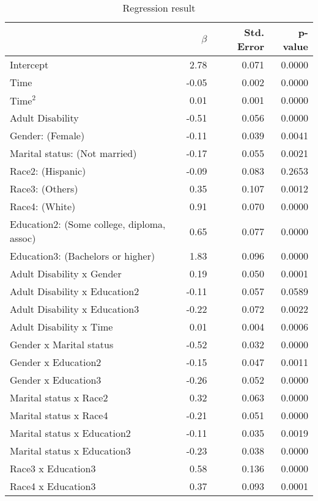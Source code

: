\begin{table}[H]
\footnotesize
\centering
\caption{Regression result} 
\begin{tabular}{lrrr}
  \hline
  & $\beta$ & Std. Error & p-value \\ 
  \hline
  Intercept & 2.78 & 0.071 & 0.0000 \\ 
  Time & -0.05 & 0.002 & 0.0000 \\ 
  $\text{Time}^2$ & 0.01 & 0.001 & 0.0000 \\ 
  Adult Disability & -0.51 & 0.056 & 0.0000 \\ 
  Gender: (Female) & -0.11 & 0.039 & 0.0041 \\ 
  Marital status: (Not married) & -0.17 & 0.055 & 0.0021 \\ 
  Race2: (Hispanic) & -0.09 & 0.083 & 0.2653 \\ 
  Race3: (Others) & 0.35 & 0.107 & 0.0012 \\ 
  Race4: (White) & 0.91 & 0.070 & 0.0000 \\ 
  Education2: (Some college, diploma, assoc) & 0.65 & 0.077 & 0.0000 \\ 
  Education3: (Bachelors or higher) & 1.83 & 0.096 & 0.0000 \\ 
  Adult Disability x Gender & 0.19 & 0.050 & 0.0001 \\ 
  Adult Disability x Education2 & -0.11 & 0.057 & 0.0589 \\ 
  Adult Disability x Education3 & -0.22 & 0.072 & 0.0022 \\ 
  Adult Disability x Time & 0.01 & 0.004 & 0.0006 \\ 
  Gender x Marital status & -0.52 & 0.032 & 0.0000 \\ 
  Gender x Education2 & -0.15 & 0.047 & 0.0011 \\ 
  Gender x Education3 & -0.26 & 0.052 & 0.0000 \\ 
  Marital status x Race2 & 0.32 & 0.063 & 0.0000 \\ 
  Marital status x Race4 & -0.21 & 0.051 & 0.0000 \\ 
  Marital status x Education2 & -0.11 & 0.035 & 0.0019 \\ 
  Marital status x Education3 & -0.23 & 0.038 & 0.0000 \\ 
  Race3 x Education3 & 0.58 & 0.136 & 0.0000 \\ 
  Race4 x Education3 & 0.37 & 0.093 & 0.0001 \\ 
  \hline
\end{tabular}
\label{tab:Table2Reg}
\end{table}

